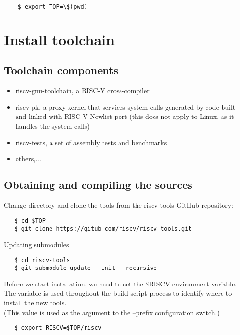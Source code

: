 \begin{verbatim}
    $ export TOP=\$(pwd)
\end{verbatim}

\section{Install toolchain}

\subsection{Toolchain components}

\begin{itemize}
\item riscv-gnu-toolchain, a RISC-V cross-compiler
\item riscv-pk, a proxy kernel that services system calls generated by code built \\and linked with RISC-V Newlist port (this does not apply to Linux, as it handles the system calls)
\item riscv-tests, a set of assembly tests and benchmarks
\item others,...
\end{itemize}

\subsection{Obtaining and compiling the sources}
Change directory and clone the tools from the riscv-tools GitHub repository:
\begin{verbatim}
   $ cd $TOP
   $ git clone https://gitub.com/riscv/riscv-tools.git
\end{verbatim}

Updating submodules
\begin{verbatim}
   $ cd riscv-tools
   $ git submodule update --init --recursive
\end{verbatim}

Before we start installation, we need to set the \$RISCV environment variable. \\The variable is used throughout the build script process to identify where to install the new tools. \\(This value is used as the argument to the --prefix configuration switch.)

\begin{verbatim}
   $ export RISCV=$TOP/riscv
\end{verbatim}

